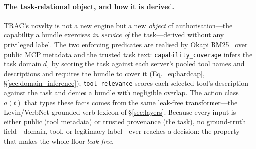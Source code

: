 \documentclass[sigconf,review,anonymous]{acmart}
\begin{document}
\paragraph{The task-relational object, and how it is derived.} TRAC's novelty is not a new engine but a new \emph{object} of authorisation---the capability a bundle exercises \emph{in service of} the task---derived without any privileged label. The two enforcing predicates are realised by Okapi BM25~\cite{robertson2009bm25} over public MCP metadata and the trusted task text: \texttt{capability\_coverage} infers the task domain $d_\tau$ by scoring the task against each server's pooled tool names and descriptions and requires the bundle to cover it (Eq.~\ref{eq:hardcap}, \S\ref{sec:domain_inference}); \texttt{tool\_relevance} scores each selected tool's description against the task and denies a bundle with negligible overlap. The action class $a(t)$ that types these facts comes from the same leak-free transformer---the Levin/VerbNet-grounded verb lexicon of \S\ref{sec:layers}. Because every input is either public (tool metadata) or trusted provenance (the task), no ground-truth field---domain, tool, or legitimacy label---ever reaches a decision: the property that makes the whole floor \emph{leak-free}.
\end{document}

